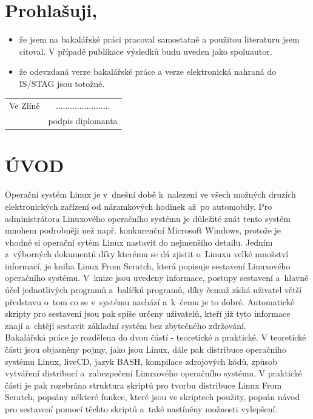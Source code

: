 \documentclass[a4paper,12pt]{article}
\newcommand{\nn}[1]{\clearpage\section*{\texorpdfstring{\uppercase{#1}}{#1}}\addcontentsline{toc}{section}{\uppercase{#1}}}%
\newcommand{\nmm}[1]{\section*{#1}} %
\newcommand{\obr}[3]{%
	\begin{figure}[h]
	\center\texttt{[image: \#1]}
	\caption{#3}
	\end{figure}
	}
\newcommand{\tab}[3]{%
	\begin{table}[h]
	\caption{#1}
	\begin{center}
	\begin{tabular}{#2}
	#3
	\end{tabular}
	\end{center}
	\end{table}
	}
\newcommand{\tabpri}[3]{%
	\begin{table}[h]
	\begin{center}
	#1
	\end{center}
	\begin{center}
	\begin{tabular}{#2}
	#3
	\end{tabular}
	\end{center}
	\end{table}
	}
\newcommand{\rov}[2][chybějici rovnice]{%
	\begin{equation}
	#2
	\label{#1}
	\end{equation}
	}
\newcommand{\obsah}{%
	\clearpage
	\thispagestyle{empty}
	\tableofcontents
	\clearpage
	\pagestyle{fancy}
	}
\renewcommand{\b}[1]{\textbf{#1}} %
\newcommand{\bi}[1]{\textbf{\textit{#1}}}	%
\renewcommand{\it}[1]{\textit{#1}}		%
\begin{document}
\nmm{Prohlašuji,}
\begin{itemize}
 \normalsize
\item že jsem na bakalářské práci pracoval samostatně a použitou literaturu jsem citoval. V případě publikace výsledků budu uveden jako spoluautor.
\item že odevzdaná verze bakalářské práce a verze elektronická nahraná do IS/STAG jsou totožné.
\end{itemize}
\vspace{1cm}
\begin{tabular}{lc}
Ve Zlíně &\hspace{9cm} .......................\\
~ &\hspace{9cm} podpis diplomanta
\end{tabular}

\obsah
\nn{Úvod}
Operační systém Linux je v~dnešní době k~nalezení ve všech možných druzích elektronických zařízení od náramkových hodinek až~po automobily. Pro administrátora Linuxového operačního systému je důležité znát tento systém mnohem podrobněji než např. konkurenční Microsoft Windows, protože je vhodné si operační sytém Linux nastavit do nejmenšího detailu. Jedním z~výborných dokumentů díky kterému se dá zjistit o~Linuxu velké množství informací, je kniha Linux From Scratch, která popisuje sestavení Linuxového operačního systému. V~knize jsou uvedeny informace, postupy sestavení a~hlavně účel jednotlivých programů a~balíčků programů, díky čemuž získá uživatel větší představu o~tom co se v~systému nachází a~k~čemu je to dobré. Automatické skripty pro sestavení jsou pak spíše určeny uživatelů, kteří již tyto informace znají a~chtějí sestavit základní systém bez zbytečného zdržování.\\

Bakalářská práce je rozdělena do dvou částí - teoretické a praktické. V teoretické části jsou objasněny pojmy, jako jsou Linux, dále pak distribuce operačního systému Linux, liveCD, jazyk BASH, kompilace zdrojových kódů, způsob vytváření distribucí a~zabezpečení Linuxového operačního systému. V praktické části je pak rozebrána struktura skriptů pro tvorbu distribuce Linux From Scratch, popsány některé funkce, které jsou ve skriptech použity, popsán návod pro sestavení pomocí těchto skriptů a~také nastíněny možnosti vylepšení.
\end{document}
